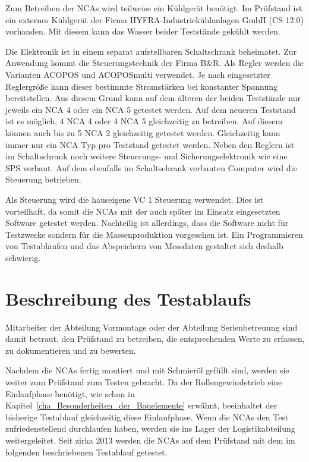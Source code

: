 
Zum Betreiben der NCAs wird teilweise ein Kühlgerät benötigt. Im Prüfstand ist ein externes Kühlgerät der Firma HYFRA-Industriekühlanlagen GmbH (CS 12.0) vorhanden. Mit diesem kann das Wasser beider Teststände gekühlt werden.

Die Elektronik ist in einem separat aufstellbaren Schaltschrank beheimatet. Zur Anwendung kommt die Steuerungstechnik der Firma B\&R. Als Regler werden die Varianten ACOPOS und ACOPOSmulti verwendet. Je nach eingesetzter Reglergröße kann dieser bestimmte Stromstärken bei konstanter Spannung bereitstellen. Aus diesem Grund kann auf dem älteren der beiden Teststände nur jeweils ein NCA 4 oder ein NCA 5 getestet werden. Auf dem neueren Teststand ist es möglich, 4 NCA 4 oder 4 NCA 5 gleichzeitig zu betreiben. Auf diesem können auch bis zu 5 NCA 2 gleichzeitig getestet werden. Gleichzeitig kann  immer nur ein NCA Typ pro Teststand getestet werden. Neben den Reglern ist im Schaltschrank noch weitere Steuerungs- und Sicherungselektronik wie eine \gls{SPS} verbaut. Auf dem ebenfalls im Schaltschrank verbauten Computer wird die Steuerung betrieben.

Als Steuerung wird die hauseigene VC 1 Steuerung verwendet. Dies ist vorteilhaft, da somit die NCAs mit der auch später im Einsatz eingesetzten Software getestet werden. Nachteilig ist allerdings, dass die Software nicht für Testzwecke sondern für die Massenproduktion vorgesehen ist. Ein Programmieren von Testabläufen und das Abspeichern von Messdaten gestaltet sich deshalb schwierig.




\section{Beschreibung des Testablaufs}\label{cha:Beschreibung_des_Testablaufs}

Mitarbeiter der Abteilung Vormontage oder der Abteilung Serienbetreuung sind damit betraut, den Prüfstand zu betreiben, die entsprechenden Werte zu erfassen, zu dokumentieren und zu bewerten.

Nachdem die NCAs fertig montiert und mit Schmieröl gefüllt sind, werden sie weiter zum Prüfstand zum Testen gebracht.  Da der Rollengewindetrieb eine Einlaufphase benötigt, wie schon in Kapitel~\ref{cha_Besonderheiten_der_Bauelemente} erwähnt, beeinhaltet der bisherige Testablauf gleichzeitig diese Einlaufphase. Wenn die NCAs den Test zufriedenstellend durchlaufen haben, werden sie ins Lager der Logistikabteilung weitergeleitet. Seit zirka 2013 werden die NCAs auf dem Prüfstand mit dem im folgenden beschriebenen Testablauf getestet.


